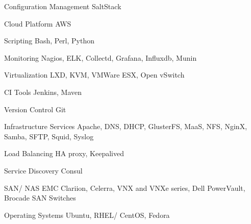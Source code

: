 

\begin{cvskills}

  \cvskill
    {Configuration Management} %
    {SaltStack} %

  \cvskill
    {Cloud Platform} %
    {AWS} %

  \cvskill
    {Scripting} %
    {Bash, Perl, Python} %

  \cvskill
    {Monitoring} %
    {Nagios, ELK, Collectd, Grafana, Influxdb, Munin} %

  \cvskill
    {Virtualization} %
    {LXD, KVM, VMWare ESX, Open vSwitch} %

  \cvskill
    {CI Tools} %
    {Jenkins, Maven} %

  \cvskill
    {Version Control} %
    {Git} %

  \cvskill
    {Infrastructure Services} %
    {Apache, DNS, DHCP, GlusterFS, MaaS, NFS, NginX, Samba, SFTP, Squid, Syslog} %

  \cvskill
    {Load Balancing} %
    {HA proxy, Keepalived} %

  \cvskill
    {Service Discovery} %
    {Consul} %

  \cvskill
    {SAN/ NAS} %
    {EMC Clariion, Celerra, VNX and VNXe series, Dell PowerVault, Brocade SAN Switches} %

  \cvskill
    {Operating Systems} %
    {Ubuntu, RHEL/ CentOS, Fedora} %


\end{cvskills}

